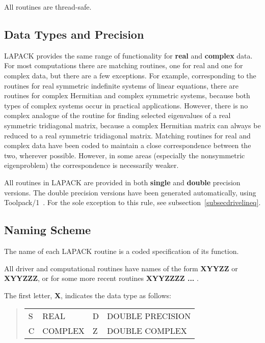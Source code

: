 All routines are thread-safe.

\subsection{Data Types and Precision}

LAPACK provides the same range of functionality for {\bf real}
and {\bf complex} data.
For most computations there are matching
routines, one for real and one for complex data,
but there are a few exceptions. For example, corresponding to the routines
for real symmetric indefinite systems of linear equations, there are
routines for complex Hermitian and complex symmetric systems,
because both types of complex systems occur in practical applications.
However, there is no complex analogue of the routine for finding
selected eigenvalues of a real symmetric tridiagonal matrix,
because a complex Hermitian matrix can always be reduced to
a real symmetric tridiagonal matrix.
Matching routines for real and complex data have been coded
to maintain a close correspondence between the two, wherever possible.
However, in some areas (especially the nonsymmetric eigenproblem) the
correspondence is necessarily weaker.

All routines in LAPACK are provided in both {\bf single} and
{\bf double} precision versions. The double precision versions have
been generated automatically, using Toolpack/1~\cite{Toolpack}.
For the sole exception to this rule, see subsection~\ref{subsecdrivelineq}.

\subsection{Naming Scheme}\label{subsecnaming}

The name of each LAPACK routine is a coded specification of
its function.

All driver and computational routines have names
of the form {\bf XYYZZ} or {\bf XYYZZZ}, or for some more recent routines
{\bf XYYZZZZ ... }.

The first letter, {\bf X}, indicates the data type as follows:

\begin{quote}
\begin{tabular} { l l l l }
S & REAL                      & D & DOUBLE PRECISION \\
C & COMPLEX               & Z & DOUBLE COMPLEX \\
\end{tabular}
\end{quote}

